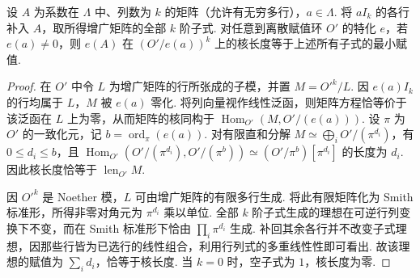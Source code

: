 \begin{lemma}[以最高阶子式刻画商模上的矩阵核长度]
\label{lem:c-selmer-minors-length}
\emitthmsource
设 $A$ 为系数在 $\Lambda$ 中、列数为 $k$ 的矩阵（允许有无穷多行），$a\in\Lambda$.
将 $a I_k$ 的各行补入 $A$，取所得增广矩阵的全部 $k$ 阶子式.
对任意到离散赋值环 $O'$ 的特化 $e$，若 $e(a)\ne0$，则 $e(A)$ 在 $(O'/e(a))^k$ 上的核长度等于上述所有子式的最小赋值.
\end{lemma}
\begin{proof}
在 $O'$ 中令 $L$ 为增广矩阵的行所张成的子模，并置 $M=O'^k/L$.
因 $e(a)I_k$ 的行均属于 $L$，$M$ 被 $e(a)$ 零化.
将列向量视作线性泛函，则矩阵方程恰等价于该泛函在 $L$ 上为零，从而矩阵的核同构于 $\operatorname{Hom}_{O'}(M,O'/(e(a)))$.
设 $\pi$ 为 $O'$ 的一致化元，记 $b=\operatorname{ord}_\pi(e(a))$.
对有限直和分解 $M\simeq\bigoplus_i O'/(\pi^{d_i})$，有 $0\le d_i\le b$，且 $\operatorname{Hom}_{O'}(O'/(\pi^{d_i}),O'/(\pi^b))\simeq(O'/\pi^b)[\pi^{d_i}]$ 的长度为 $d_i$.
因此核长度恰等于 $\operatorname{len}_{O'} M$.

因 $O'^k$ 是 Noether 模，$L$ 可由增广矩阵的有限多行生成.
将此有限矩阵化为 Smith 标准形，所得非零对角元为 $\pi^{d_i}$ 乘以单位.
全部 $k$ 阶子式生成的理想在可逆行列变换下不变，而在 Smith 标准形下恰由 $\prod_i\pi^{d_i}$ 生成.
补回其余各行并不改变子式理想，因那些行皆为已选行的线性组合，利用行列式的多重线性性即可看出.
故该理想的赋值为 $\sum_i d_i$，恰等于核长度.
当 $k=0$ 时，空子式为 $1$，核长度为零.
\end{proof}

